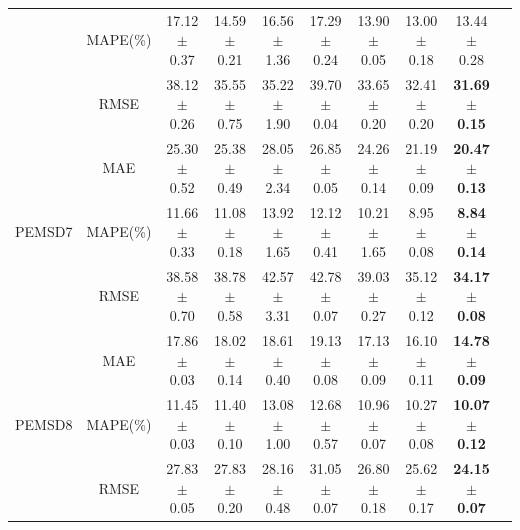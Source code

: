 \begin{table}[!htb]
{\begin{tabular}{cccccccccc}
            \multicolumn{1}{c|}{}                        & \multicolumn{1}{c|}{MAPE(\%)} & 17.12 $\pm$ 0.37 & 14.59 $\pm$ 0.21 & 16.56 $\pm$ 1.36 & 17.29 $\pm$ 0.24 & 13.90 $\pm$ 0.05 & 13.00 $\pm$ 0.18 & 13.44 $\pm$ 0.28          \\
            \multicolumn{1}{c|}{}                        & \multicolumn{1}{c|}{RMSE}     & 38.12 $\pm$ 0.26 & 35.55 $\pm$ 0.75 & 35.22 $\pm$ 1.90 & 39.70 $\pm$ 0.04 & 33.65 $\pm$ 0.20 & 32.41 $\pm$ 0.20 & \textbf{31.69 $\pm$ 0.15} \\
            \hline
            \multicolumn{1}{c|}{\multirow{3}{*}{PEMSD7}} & \multicolumn{1}{c|}{MAE}      & 25.30 $\pm$ 0.52 & 25.38 $\pm$ 0.49 & 28.05 $\pm$ 2.34 & 26.85 $\pm$ 0.05 & 24.26 $\pm$ 0.14 & 21.19 $\pm$ 0.09      & \textbf{20.47 $\pm$ 0.13} \\
            \multicolumn{1}{c|}{}                        & \multicolumn{1}{c|}{MAPE(\%)} & 11.66 $\pm$ 0.33 & 11.08 $\pm$ 0.18 & 13.92 $\pm$ 1.65 & 12.12 $\pm$ 0.41 & 10.21 $\pm$ 1.65 & 8.95 $\pm$ 0.08       & \textbf{8.84 $\pm$ 0.14}  \\
            \multicolumn{1}{c|}{}                        & \multicolumn{1}{c|}{RMSE}     & 38.58 $\pm$ 0.70 & 38.78 $\pm$ 0.58 & 42.57 $\pm$ 3.31 & 42.78 $\pm$ 0.07 & 39.03 $\pm$ 0.27 & 35.12 $\pm$ 0.12      & \textbf{34.17 $\pm$ 0.08} \\
            \hline
            \multicolumn{1}{c|}{\multirow{3}{*}{PEMSD8}} & \multicolumn{1}{c|}{MAE}      & 17.86 $\pm$ 0.03 & 18.02 $\pm$ 0.14 & 18.61 $\pm$ 0.40 & 19.13 $\pm$ 0.08 & 17.13 $\pm$ 0.09 & 16.10 $\pm$ 0.11 & \textbf{14.78 $\pm$ 0.09} \\
            \multicolumn{1}{c|}{}                        & \multicolumn{1}{c|}{MAPE(\%)} & 11.45 $\pm$ 0.03 & 11.40 $\pm$ 0.10 & 13.08 $\pm$ 1.00 & 12.68 $\pm$ 0.57 & 10.96 $\pm$ 0.07 & 10.27 $\pm$ 0.08 & \textbf{10.07 $\pm$ 0.12} \\
            \multicolumn{1}{c|}{}                        & \multicolumn{1}{c|}{RMSE}     & 27.83 $\pm$ 0.05 & 27.83 $\pm$ 0.20 & 28.16 $\pm$ 0.48 & 31.05 $\pm$ 0.07 & 26.80 $\pm$ 0.18 & 25.62 $\pm$ 0.17 & \textbf{24.15 $\pm$ 0.07} \\
           \bottomrule[2pt]
        \end{tabular}
    }
\end{table}

